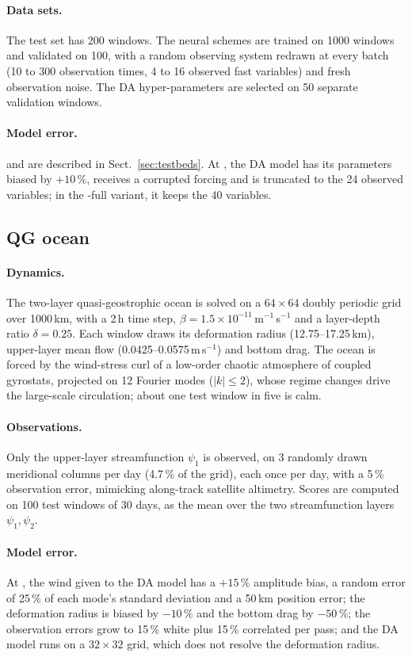 \paragraph{Data sets.}
The test set has 200 windows. The neural schemes are trained on 1000 windows and
validated on 100, with a random observing system redrawn at every batch (10 to 300
observation times, 4 to 16 observed fast variables) and fresh observation noise. The DA
hyper-parameters are selected on 50 separate validation windows.

\paragraph{Model error.}
\Sz{} and \So{} are described in Sect.~\ref{sec:testbeds}. At \So{}, the DA model has
its parameters biased by $+10\,\%$, receives a corrupted forcing and is truncated to the
24 observed variables; in the \So-full variant, it keeps the 40 variables.

\subsection{QG ocean}
\paragraph{Dynamics.}
The two-layer quasi-geostrophic ocean is solved on a $64 \times 64$ doubly periodic grid
over 1000\,km, with a 2\,h time step, $\beta = 1.5 \times 10^{-11}$\,m$^{-1}$\,s$^{-1}$
and a layer-depth ratio $\delta = 0.25$. Each window draws its deformation radius
(12.75--17.25\,km), upper-layer mean flow (0.0425--0.0575\,m\,s$^{-1}$) and bottom drag.
The ocean is forced by the wind-stress curl of a low-order chaotic atmosphere of coupled
gyrostats, projected on 12 Fourier modes ($|k| \le 2$), whose regime changes drive the
large-scale circulation; about one test window in five is calm.

\paragraph{Observations.}
Only the upper-layer streamfunction $\psi_1$ is observed, on 3 randomly drawn meridional
columns per day (4.7\,\% of the grid), each once per day, with a 5\,\% observation
error, mimicking along-track satellite altimetry. Scores are computed on 100 test
windows of 30 days, as the mean over the two streamfunction layers $\psi_1, \psi_2$.

\paragraph{Model error.}
At \So{}, the wind given to the DA model has a $+15\,\%$ amplitude bias, a random error of
25\,\% of each mode's standard deviation and a 50\,km position error; the deformation
radius is biased by $-10\,\%$ and the bottom drag by $-50\,\%$; the observation errors
grow to 15\,\% white plus 15\,\% correlated per pass; and the DA model runs on a
$32 \times 32$ grid, which does not resolve the deformation radius.

